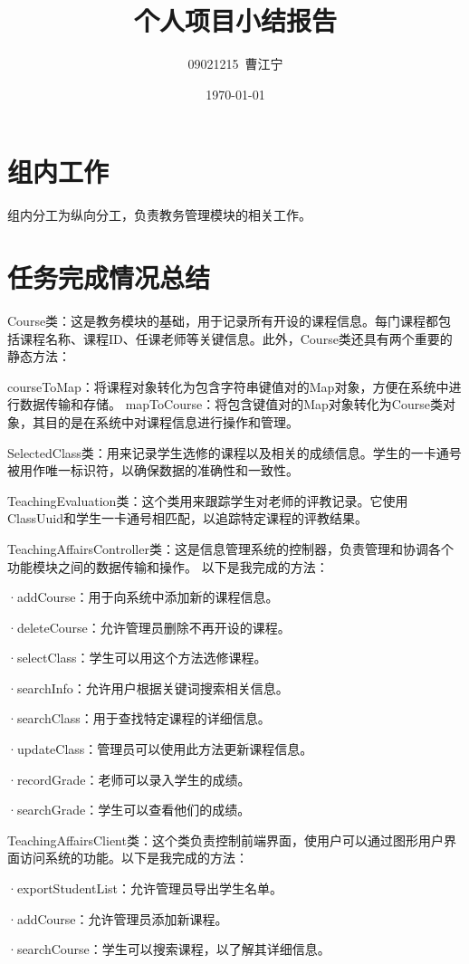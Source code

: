 \documentclass{article}
\title{个人项目小结报告}
\author{09021215~曹江宁}
\date{\today}
\begin{document}
\maketitle
\section{组内工作}
组内分工为纵向分工，负责教务管理模块的相关工作。
\section{任务完成情况总结}
Course类：这是教务模块的基础，用于记录所有开设的课程信息。每门课程都包括课程名称、课程ID、任课老师等关键信息。此外，Course类还具有两个重要的静态方法：

courseToMap：将课程对象转化为包含字符串键值对的Map对象，方便在系统中进行数据传输和存储。
mapToCourse：将包含键值对的Map对象转化为Course类对象，其目的是在系统中对课程信息进行操作和管理。

SelectedClass类：用来记录学生选修的课程以及相关的成绩信息。学生的一卡通号被用作唯一标识符，以确保数据的准确性和一致性。

TeachingEvaluation类：这个类用来跟踪学生对老师的评教记录。它使用ClassUuid和学生一卡通号相匹配，以追踪特定课程的评教结果。

TeachingAffairsController类：这是信息管理系统的控制器，负责管理和协调各个功能模块之间的数据传输和操作。
以下是我完成的方法：

·addCourse：用于向系统中添加新的课程信息。

·deleteCourse：允许管理员删除不再开设的课程。

·selectClass：学生可以用这个方法选修课程。

·searchInfo：允许用户根据关键词搜索相关信息。

·searchClass：用于查找特定课程的详细信息。

·updateClass：管理员可以使用此方法更新课程信息。

·recordGrade：老师可以录入学生的成绩。

·searchGrade：学生可以查看他们的成绩。

\par TeachingAffairsClient类：这个类负责控制前端界面，使用户可以通过图形用户界面访问系统的功能。以下是我完成的方法：

·exportStudentList：允许管理员导出学生名单。

·addCourse：允许管理员添加新课程。

·searchCourse：学生可以搜索课程，以了解其详细信息。
\end{document}
